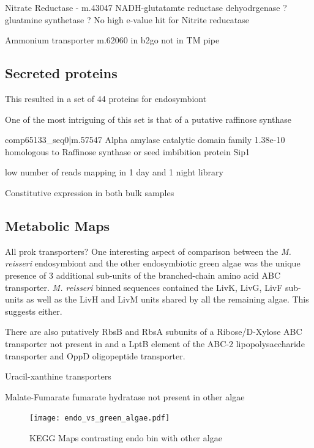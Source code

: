 Nitrate Reductase - m.43047  
NADH-glutatamte reductase dehyodrgenase ?
gluatmine synthetase ?
No high e-value hit for Nitrite reducatase

Ammonium transporter m.62060 in b2go not in TM pipe






\subsection{Secreted proteins}

This resulted in a set of 44 proteins for endosymbiont 




One of the most intriguing of this set is that
of a putative raffinose synthase


comp65133\_seq0|m.57547 Alpha amylase catalytic domain family
1.38e-10
homologous to Raffinose synthase or seed imbibition protein Sip1


low number of reads mapping in 1 day and 1 night library

Constitutive expression in both bulk samples 

\subsection{Metabolic Maps}



All prok transporters?
One interesting aspect of comparison between the \textit{M. reisseri}
endosymbiont and the other endosymbiotic green algae was the unique presence of 3
additional sub-units of the branched-chain amino acid ABC transporter.
\textit{M. reisseri} binned sequences contained the LivK, LivG, LivF sub-units
as well as the LivH and LivM units shared by all the remaining algae. 
This suggests either. 

There are also putatively RbsB and RbsA subunits of a Ribose/D-Xylose
ABC transporter not present in 
and a LptB element of the ABC-2 lipopolysaccharide transporter
and OppD oligopeptide transporter.


Uracil-xanthine transporters




Malate-Fumarate fumarate hydratase not present in other algae





\begin{figure}
    \texttt{[image: endo\_vs\_green\_algae.pdf]}
    \caption[KEGG Maps of Endosymbiont Bin Compared with Other Algae]{
    KEGG Maps contrasting endo bin with other algae}
\end{figure}


